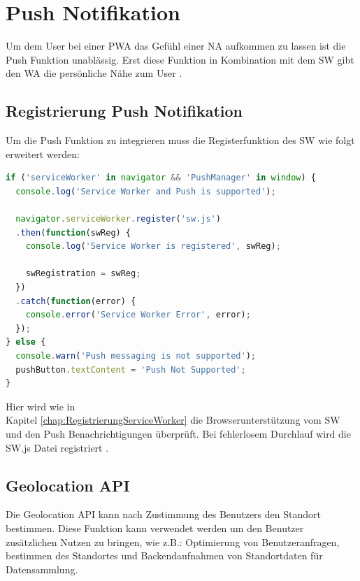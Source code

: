 \section{Push Notifikation}
Um dem User bei einer \acs{PWA} das Gefühl einer \acl{NA} aufkommen zu lassen ist die Push Funktion unablässig. Erst diese Funktion in Kombination mit dem \acs{SW} gibt den \acl{WA} die persönliche Nähe zum User \cite{PushNotifikation}.



\subsection{Registrierung Push Notifikation}
Um die Push Funktion zu integrieren muss die Registerfunktion des \acs{SW} wie folgt erweitert werden:
 
\begin{lstlisting}[language=JavaScript, caption={Push Notifications},label=lst:PushNotifikation, xleftmargin=50pt]
if ('serviceWorker' in navigator && 'PushManager' in window) {
  console.log('Service Worker and Push is supported');

  navigator.serviceWorker.register('sw.js')
  .then(function(swReg) {
    console.log('Service Worker is registered', swReg);

    swRegistration = swReg;
  })
  .catch(function(error) {
    console.error('Service Worker Error', error);
  });
} else {
  console.warn('Push messaging is not supported');
  pushButton.textContent = 'Push Not Supported';
}
\end{lstlisting}

Hier wird wie in \\ Kapitel \ref{chap:RegistrierungServiceWorker} die Browserunterstützung vom \acs{SW} und den Push Benachrichtigungen überprüft. Bei fehlerlosem Durchlauf wird die \acs{SW}.js Datei registriert \cite{PushNotifikation}.

\newpage



\subsection{Geolocation API}
Die Geolocation API kann nach Zustimmung des Benutzers den Standort bestimmen. Diese Funktion kann verwendet werden um  den Benutzer zusätzlichen Nutzen zu bringen, wie z.B.: Optimierung von Benutzeranfragen, bestimmen des Standortes und Backendaufnahmen von Standortdaten für Datensammlung.

